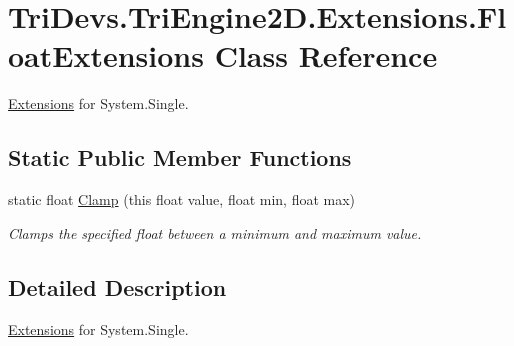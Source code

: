\hypertarget{class_tri_devs_1_1_tri_engine2_d_1_1_extensions_1_1_float_extensions}{\section{Tri\-Devs.\-Tri\-Engine2\-D.\-Extensions.\-Float\-Extensions Class Reference}
\label{class_tri_devs_1_1_tri_engine2_d_1_1_extensions_1_1_float_extensions}
}


\hyperlink{namespace_tri_devs_1_1_tri_engine2_d_1_1_extensions}{Extensions} for System.\-Single.  


\subsection*{Static Public Member Functions}
\begin{DoxyCompactItemize}
\item 
static float \hyperlink{class_tri_devs_1_1_tri_engine2_d_1_1_extensions_1_1_float_extensions_a038e638dd531e04d8ac14ecd1a159d0e}{Clamp} (this float value, float min, float max)
\begin{DoxyCompactList}\small\item\em Clamps the specified float between a minimum and maximum value. \end{DoxyCompactList}\end{DoxyCompactItemize}


\subsection{Detailed Description}
\hyperlink{namespace_tri_devs_1_1_tri_engine2_d_1_1_extensions}{Extensions} for System.\-Single. 




